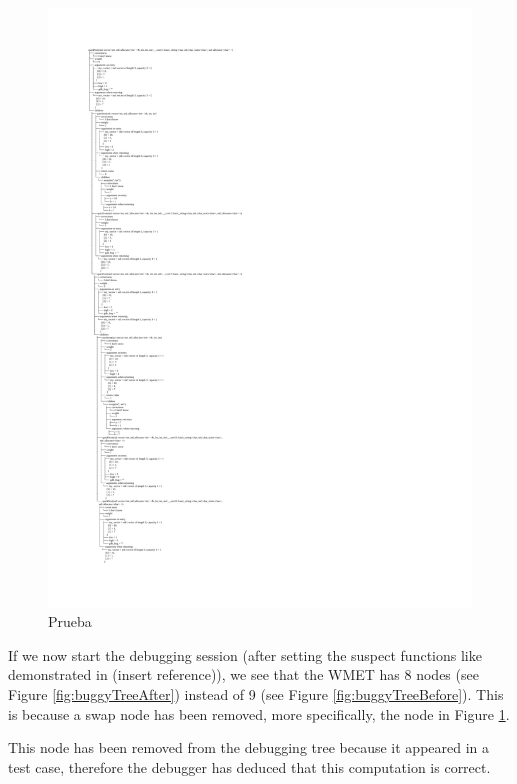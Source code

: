 \begin{figure}[p]
\centering
    \caption{Prueba}
    \label{fig:correctNodeRemoved}
\includegraphics[width=\textwidth,height=\textheight,keepaspectratio]{Imagenes/Vectorial/buggy.pdf}
\end{figure}
If we now start the debugging session (after setting the suspect functions like demonstrated in (insert reference)), we see that the WMET has 8 nodes (see Figure \ref{fig:buggyTreeAfter}) instead of 9 (see Figure \ref{fig:buggyTreeBefore}). This is because a swap node has been removed, more specifically, the node in Figure \ref{fig:correctNodeRemoved}.


This node has been removed from the debugging tree because it appeared in a test case, therefore the debugger has deduced that this computation is correct.




